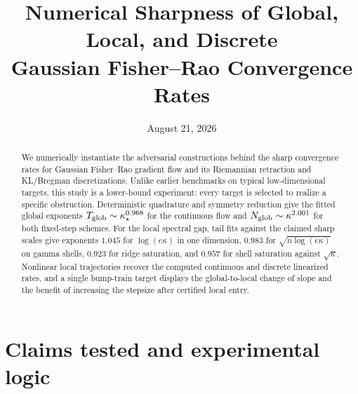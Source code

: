 \documentclass[11pt]{article}
\title{Numerical Sharpness of Global, Local, and Discrete\\
Gaussian Fisher--Rao Convergence Rates}
\author{}
\date{August 21, 2026}
\begin{document}
\maketitle

\begin{abstract}
We numerically instantiate the adversarial constructions behind the sharp
convergence rates for Gaussian Fisher--Rao gradient flow and its Riemannian
retraction and KL/Bregman discretizations.  Unlike earlier benchmarks on
typical low-dimensional targets, this study is a lower-bound experiment: every
target is selected to realize a specific obstruction.  Deterministic
quadrature and symmetry reduction give the fitted global exponents
$T_{\rm glob}\sim\kappa_\star^{0.968}$ for the continuous flow and
$N_{\rm glob}\sim\kappa^{2.001}$ for both fixed-step schemes.  For the local
spectral gap, tail fits against the claimed sharp scales give exponents $1.045$
for $\log(e\kappa)$ in one dimension, $0.983$ for
$\sqrt{n\log(e\kappa)}$ on gamma shells, $0.923$ for ridge saturation, and
$0.957$ for shell saturation against $\sqrt\kappa$.  Nonlinear local
trajectories recover the computed continuous and discrete linearized rates,
and a single bump-train target displays the global-to-local change of slope and
the benefit of increasing the stepsize after certified local entry.
\end{abstract}

\section{Claims tested and experimental logic}
\end{document}
